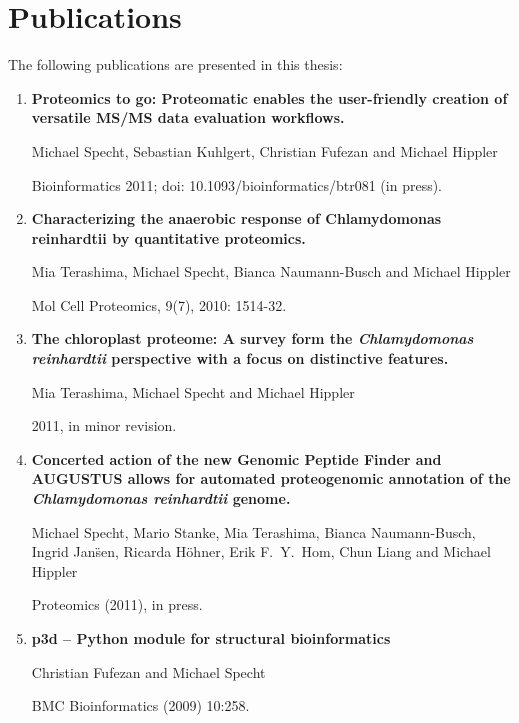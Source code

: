 \chapter{Publications}

The following publications are presented in this thesis:

\begin{enumerate}
\item 
{\bf Proteomics to go: Proteomatic enables the user-friendly creation of versatile MS/MS data evaluation workflows.}

Michael Specht, Sebastian Kuhlgert, Christian Fufezan and Michael Hippler

Bioinformatics 2011; doi: 10.1093/bioinformatics/btr081 (in press).

\item
{\bf Characterizing the anaerobic response of Chlamydomonas reinhardtii by quantitative proteomics.}

Mia Terashima, Michael Specht, Bianca Naumann-Busch and Michael Hippler

Mol Cell Proteomics, 9(7), 2010: 1514-32.

\item
{\bf The chloroplast proteome: A survey form the {\em Chlamydomonas reinhardtii} perspective with a focus on distinctive features.}

Mia Terashima, Michael Specht and Michael Hippler

2011, in minor revision.

\item
{\bf Concerted action of the new Genomic Peptide Finder and AUGUSTUS allows for automated proteogenomic annotation of the {\em Chlamydomonas reinhardtii} genome.}

Michael Specht, Mario Stanke, Mia Terashima, Bianca Naumann-Busch, Ingrid Jan\"sen, Ricarda H\"ohner, Erik F.~Y.~Hom, Chun Liang and Michael Hippler

Proteomics (2011), in press.

% 
\item
{\bf p3d -- Python module for structural bioinformatics}

Christian Fufezan and Michael Specht

BMC Bioinformatics (2009) 10:258.

\end{enumerate}

